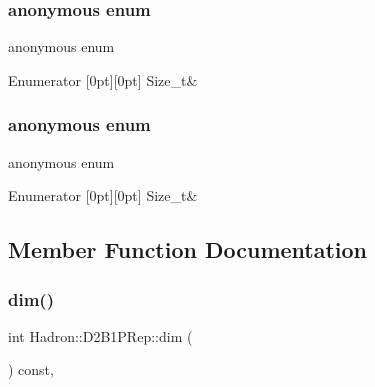 \subsubsection{\texorpdfstring{anonymous enum}{anonymous enum}}
{\footnotesize\ttfamily anonymous enum}

\begin{DoxyEnumFields}{Enumerator}
[0pt][0pt]{}\mbox{\label{structHadron_1_1D2B1PRep_a2505067fbb5d699c6d52dceddfde82abaf46023b20380d5e86beca0a0383b96ec}} 
Size\+\_\+t&\\
\hline

\end{DoxyEnumFields}
\mbox{\label{structHadron_1_1D2B1PRep_a2505067fbb5d699c6d52dceddfde82ab}} 
\subsubsection{\texorpdfstring{anonymous enum}{anonymous enum}}
{\footnotesize\ttfamily anonymous enum}

\begin{DoxyEnumFields}{Enumerator}
[0pt][0pt]{}\mbox{\label{structHadron_1_1D2B1PRep_a2505067fbb5d699c6d52dceddfde82abaf46023b20380d5e86beca0a0383b96ec}} 
Size\+\_\+t&\\
\hline

\end{DoxyEnumFields}


\subsection{Member Function Documentation}
\mbox{\label{structHadron_1_1D2B1PRep_ab30c51be75c1d6ca41fa1d56c9089d2e}} 
\subsubsection{\texorpdfstring{dim()}{dim()}\hspace{0.1cm}{\footnotesize\ttfamily [1/2]}}
{\footnotesize\ttfamily int Hadron\+::\+D2\+B1\+P\+Rep\+::dim (\begin{DoxyParamCaption}{ }\end{DoxyParamCaption}) const\hspace{0.3cm}{\ttfamily [inline]}, {\ttfamily [virtual]}}

